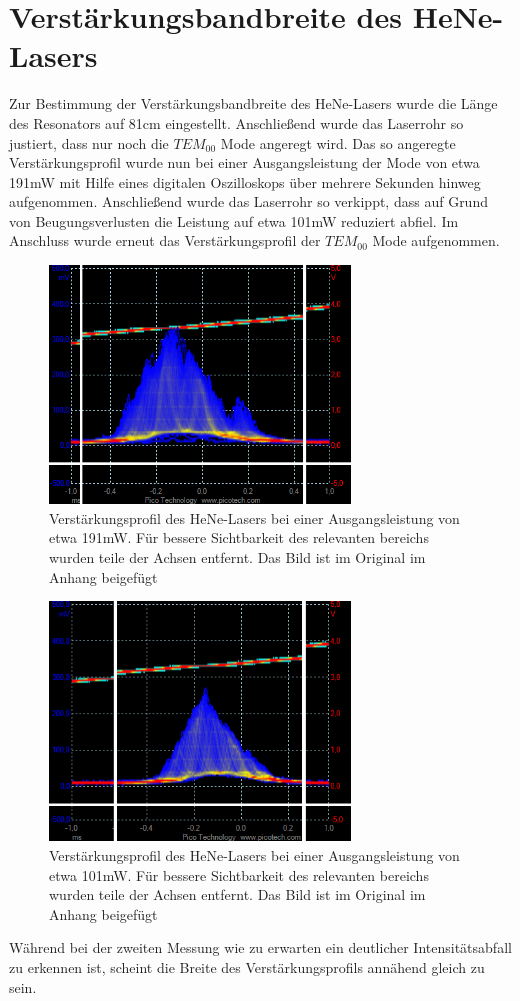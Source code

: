 \documentclass[bigchapter,colorback,accentcolor=tud4b,linedtoc,11pt]{tudreport}
\numberwithin{equation}{subsection}
\begin{document}
\section{Verstärkungsbandbreite des HeNe-Lasers}
Zur Bestimmung der Verstärkungsbandbreite des HeNe-Lasers wurde die Länge des Resonators auf 81cm eingestellt. Anschließend wurde das Laserrohr so justiert, dass nur noch die $TEM_{00}$ Mode angeregt wird. Das so angeregte Verstärkungsprofil wurde nun bei einer Ausgangsleistung der Mode von etwa 191mW mit Hilfe eines digitalen Oszilloskops über mehrere Sekunden hinweg aufgenommen. Anschließend wurde das Laserrohr so verkippt, dass auf Grund von Beugungsverlusten die Leistung auf etwa 101mW reduziert abfiel. Im Anschluss wurde erneut das Verstärkungsprofil der $TEM_{00}$ Mode aufgenommen.

\begin{figure}[ht!]
\centering
\includegraphics[width=80mm]{Messdaten/81cm191mW4uW.png}
\caption{Verstärkungsprofil des HeNe-Lasers bei einer Ausgangsleistung von etwa 191mW. Für bessere Sichtbarkeit des relevanten bereichs wurden teile der Achsen entfernt. Das Bild ist im Original im Anhang beigefügt}
\label{HeNeBreite191mW}
\end{figure}
\begin{figure}[ht!]
\centering
\includegraphics[width=80mm]{Messdaten/81cm101mW4uW.png}
\caption{Verstärkungsprofil des HeNe-Lasers bei einer Ausgangsleistung von etwa 101mW. Für bessere Sichtbarkeit des relevanten bereichs wurden teile der Achsen entfernt. Das Bild ist im Original im Anhang beigefügt}
\label{HeNeBreite101mW}
\end{figure}
\FloatBarrier
Während bei der zweiten Messung wie zu erwarten ein deutlicher Intensitätsabfall zu erkennen ist, scheint die Breite des Verstärkungsprofils annähend gleich zu sein.
\end{document}
